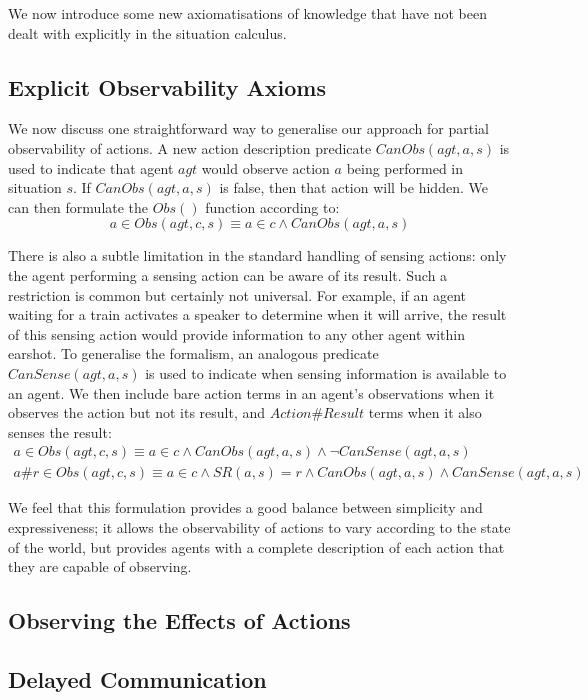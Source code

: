 We now introduce some new axiomatisations of knowledge that have not
been dealt with explicitly in the situation calculus.


\subsection{Explicit Observability Axioms}

We now discuss one straightforward way to generalise our approach
for partial observability of actions. A new action description predicate
$CanObs(agt,a,s)$ is used to indicate that agent $agt$ would observe
action $a$ being performed in situation $s$. If $CanObs(agt,a,s)$
is false, then that action will be hidden. We can then formulate the
$Obs()$ function according to:\[
a\in Obs(agt,c,s)\equiv a\in c\wedge CanObs(agt,a,s)\]


There is also a subtle limitation in the standard handling of sensing
actions: only the agent performing a sensing action can be aware of
its result. Such a restriction is common but certainly not universal.
For example, if an agent waiting for a train activates a speaker to
determine when it will arrive, the result of this sensing action would
provide information to any other agent within earshot. To generalise
the formalism, an analogous predicate $CanSense(agt,a,s)$ is used
to indicate when sensing information is available to an agent. We
then include bare action terms in an agent's observations when it
observes the action but not its result, and \emph{$Action\#Result$}
terms when it also senses the result:\begin{gather*}
a\in Obs(agt,c,s)\equiv a\in c\wedge CanObs(agt,a,s)\wedge\neg CanSense(agt,a,s)\\
a\#r\in Obs(agt,c,s)\equiv a\in c\wedge SR(a,s)=r\wedge CanObs(agt,a,s)\wedge CanSense(agt,a,s)\end{gather*}


We feel that this formulation provides a good balance between simplicity
and expressiveness; it allows the observability of actions to vary
according to the state of the world, but provides agents with a complete
description of each action that they are capable of observing.


\subsection{Observing the Effects of Actions}


\subsection{Delayed Communication}

